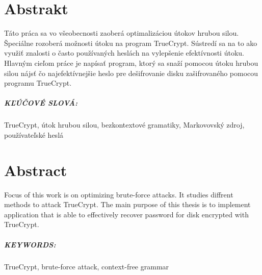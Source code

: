 \chapter*{Abstrakt}
Táto práca sa vo všeobecnosti zaoberá optimalizáciou útokov hrubou silou. Špeciálne rozoberá možnosti útoku na program TrueCrypt. Sústredí sa na to ako využiť znalosti o často používaných heslách na vylepšenie efektívnosti útoku. Hlavným cieľom práce je napísať program, ktorý sa snaží pomocou útoku hrubou silou nájsť čo najefektívnejšie heslo pre dešifrovanie disku zašifrovaného pomocou programu TrueCrypt.

\paragraph{KĽÚČOVÉ SLOVÁ:}
TrueCrypt, útok hrubou silou, bezkontextové gramatiky, Markovovský zdroj, používateľské heslá

\newpage
\chapter*{Abstract}
Focus of this work is on optimizing brute-force attacks. It studies diffrent methods to attack TrueCrypt. The main purpose of this thesis is to implement application that is able to effectively recover password for disk encrypted with TrueCrypt.

\paragraph{KEYWORDS:}
TrueCrypt, brute-force attack, context-free grammar